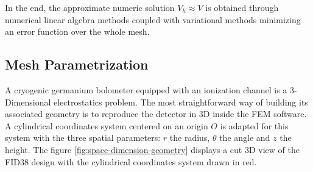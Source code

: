 %

In the end, the approximate numeric solution $V_h \approx V$ is obtained through numerical linear algebra methods coupled with variational methods minimizing an error function over the whole mesh.



\subsection{Mesh Parametrization}
\label{par:mesh-parametrization}

A cryogenic germanium bolometer equipped with an ionization channel is a 3-Dimensional electrostatics problem. The most straightforward way of building its associated geometry is to reproduce the detector in 3D inside the FEM software. A cylindrical coordinates system centered on an origin $O$ is adapted for this system with the three spatial parameters: $r$ the radius, $\theta$ the angle and $z$ the height. The figure \ref{fig:space-dimension-geometry} displays a cut 3D view of the FID38 design with the cylindrical coordinates system drawn in red. 

